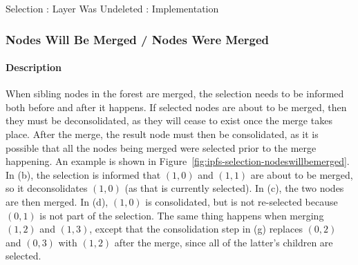 \begin{stulisting}[p]
\caption{Selection : Layer Was Undeleted : Implementation}
\label{code:ipfs-selection-layerwasundeleted}

\end{stulisting}


\afterpage{\clearpage}
\newpage

\subsubsection{Nodes Will Be Merged / Nodes Were Merged}


\paragraph{Description}

When sibling nodes in the forest are merged, the selection needs to be informed both before and after it happens. If selected nodes are about to be merged, then they must be deconsolidated, as they will cease to exist once the merge takes place. After the merge, the result node must then be consolidated, as it is possible that all the nodes being merged were selected prior to the merge happening. An example is shown in Figure~\ref{fig:ipfs-selection-nodeswillbemerged}. In (b), the selection is informed that $(1,0)$ and $(1,1)$ are about to be merged, so it deconsolidates $(1,0)$ (as that is currently selected). In (c), the two nodes are then merged. In (d), $(1,0)$ is consolidated, but is not re-selected because $(0,1)$ is not part of the selection. The same thing happens when merging $(1,2)$ and $(1,3)$, except that the consolidation step in (g) replaces $(0,2)$ and $(0,3)$ with $(1,2)$ after the merge, since all of the latter's children are selected.

